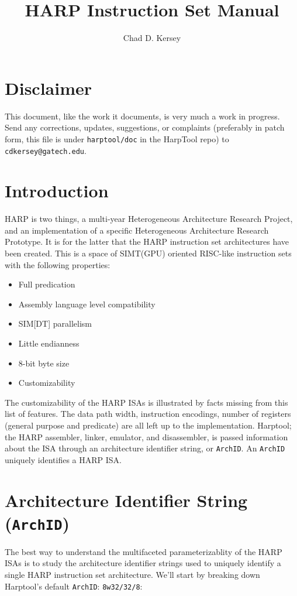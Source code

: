 \documentclass[10pt,letterpaper]{article}
\title{HARP Instruction Set Manual}
\author{Chad D. Kersey}
\begin{document}
\maketitle
\section*{Disclaimer}
This document, like the work it documents, is very much a work in progress.
Send any corrections, updates, suggestions, or complaints (preferably in patch form, this file is under \texttt{harptool/doc} in the HarpTool repo) to \texttt{cdkersey@gatech.edu}.

\section*{Introduction}
HARP is two things, a multi-year Heterogeneous Architecture Research Project, and an implementation of a specific Heterogeneous Architecture Research Prototype.
It is for the latter that the HARP instruction set architectures have been created.
This is a space of SIMT(GPU) oriented RISC-like instruction sets with the following properties:

\begin{itemize}
  \item{Full predication}
  \item{Assembly language level compatibility}
  \item{SIM[DT] parallelism}
  \item{Little endianness}
  \item{8-bit byte size}
  \item{Customizability}
\end{itemize}

The customizability of the HARP ISAs is illustrated by facts missing from this list of features.
The data path width, instruction encodings, number of registers (general purpose and predicate) are all left up to the implementation.
Harptool; the HARP assembler, linker, emulator, and disassembler, is passed information about the ISA through an architecture identifier string, or \texttt{ArchID}.
An \texttt{ArchID} uniquely identifies a HARP ISA.

\section{Architecture Identifier String (\texttt{ArchID})}
The best way to understand the multifaceted parameterizablity of the HARP ISAs is to study the architecture identifier strings used to uniquely identify a single HARP instruction set architecture.
We'll start by breaking down Harptool's default \texttt{ArchID}: \texttt{8w32/32/8}:
\end{document}
